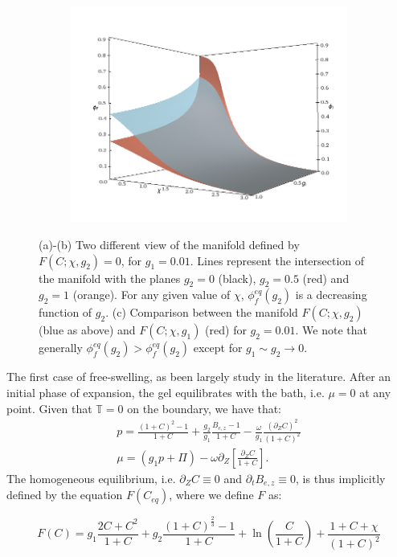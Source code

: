\documentclass[12pt]{extarticle}
\begin{document}
\begin{figure}
	\begin{subfigure}{1\textwidth}
		\centering
		\includegraphics[scale=0.37]{images/trial4}
		\caption{}
	\end{subfigure}
	\caption{(a)-(b) Two different view of the manifold defined by $F(C;\chi,g_2)=0$, for $g_1=0.01$. Lines represent the intersection of the manifold with the planes $g_2=0$ (black), $g_2=0.5$ (red) and $g_2=1$ (orange). For any given value of $\chi$, $\phi_f^{eq}(g_2)$ is a decreasing function of $g_2$. (c) Comparison between the manifold $F(C;\chi,g_2)$ (blue as above) and $F(C;\chi,g_1)$ (red) for $g_2=0.01$. We note that generally $\phi_f^{eq}(g_2)>\phi_f^{eq}(g_2)$ except for $g_1\sim g_2\rightarrow 0$.}
	\label{fig2}
\end{figure} 

The first case of free-swelling, as been largely study in the literature. After an initial phase of expansion, the gel equilibrates with the bath, i.e. $\mu=0$ at any point. Given that $\mathbb{T}=0$ on the boundary, we have that:
\begin{gather}
p= \frac{(1+C)^2-1}{1+C}+\frac{g_2}{g_1} \frac{B_{e,z}-1}{1+C}- \frac{\omega}{g_1} \frac{(\partial_Z C)^2}{(1+C)^2}\\
\mu= (g_1 p + \Pi)-\omega \partial_Z \left[\frac{\partial_Z C}{1+C}\right].
\end{gather}
The homogeneous equilibrium, i.e. $\partial_Z C\equiv0$ and $\partial_tB_{e,z}\equiv0$, is thus implicitly defined by the equation $F(C_{eq})$, where we define $F$ as:

\begin{equation}
F(C)= g_1 \frac{2C+C^2}{1+C}+g_2 \frac{(1+C)^{\frac{2}{3}}-1}{1+C}+\ln\left(\frac{C}{1+C}\right)+ \frac{1+C+\chi}{(1+C)^2}
\label{eq1}
\end{equation}
\end{document}
